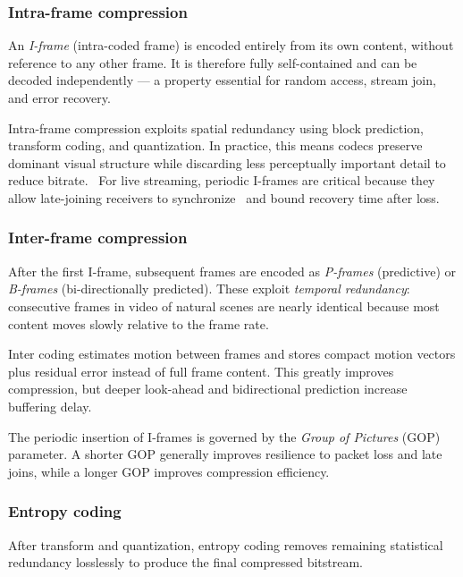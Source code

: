 \subsubsection{Intra-frame compression}
An \textit{I-frame} (intra-coded frame) is encoded entirely from its own content, without reference to any other frame. It is therefore fully self-contained and can be decoded independently — a property essential for random access, stream join, and error recovery.~\cite{apostolopoulosVideoStreamingConcepts,WebVideoCodec2025}

Intra-frame compression exploits spatial redundancy using block prediction, transform coding, and quantization. In practice, this means codecs preserve dominant visual structure while discarding less perceptually important detail to reduce bitrate.~\cite{apostolopoulosVideoStreamingConcepts,WebVideoCodec2025} For live streaming, periodic I-frames are critical because they allow late-joining receivers to synchronize~\cite{apostolopoulosVideoStreamingConcepts,WebVideoCodec2025} and bound recovery time after loss.~\cite{apostolopoulosVideoStreamingConcepts,WebVideoCodec2025}

\subsubsection{Inter-frame compression}
After the first I-frame, subsequent frames are encoded as \textit{P-frames} (predictive) or \textit{B-frames} (bi-directionally predicted). These exploit \textit{temporal redundancy}: consecutive frames in video of natural scenes are nearly identical because most content moves slowly relative to the frame rate.~\cite{apostolopoulosVideoStreamingConcepts,WebVideoCodec2025}

Inter coding estimates motion between frames and stores compact motion vectors plus residual error instead of full frame content. This greatly improves compression, but deeper look-ahead and bidirectional prediction increase buffering delay.~\cite{apostolopoulosVideoStreamingConcepts,WebVideoCodec2025}

The periodic insertion of I-frames is governed by the \textit{Group of Pictures} (GOP) parameter. A shorter GOP generally improves resilience to packet loss and late joins, while a longer GOP improves compression efficiency.~\cite{apostolopoulosVideoStreamingConcepts,WebVideoCodec2025}

\subsubsection{Entropy coding}
After transform and quantization, entropy coding removes remaining statistical redundancy losslessly to produce the final compressed bitstream.~\cite{apostolopoulosVideoStreamingConcepts,WebVideoCodec2025}

